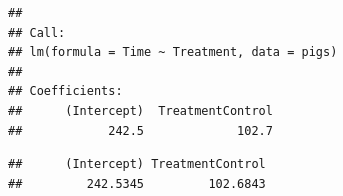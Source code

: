 \documentclass[
]{book}
\newenvironment{Shaded}{\begin{snugshade}}{\end{snugshade}}
\newcommand{\NormalTok}[1]{#1}
\newcommand{\SpecialCharTok}[1]{\textcolor[rgb]{0.00,0.00,0.00}{#1}}
\begin{document}
\begin{verbatim}
## 
## Call:
## lm(formula = Time ~ Treatment, data = pigs)
## 
## Coefficients:
##      (Intercept)  TreatmentControl  
##            242.5             102.7
\end{verbatim}

\begin{Shaded}
\end{Shaded}

\begin{verbatim}
##      (Intercept) TreatmentControl 
##         242.5345         102.6843
\end{verbatim}
\end{document}
